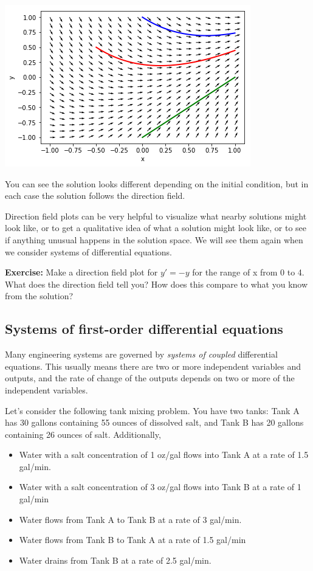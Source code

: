 \documentclass[11pt]{article}
\begin{document}
\begin{center}
\includegraphics[width=.9\linewidth]{obipy-resources/05b8b46ebbc2df3b9d545d77190f5234-683116FB.png}
\end{center}

You can see the solution looks different depending on the initial condition, but in each case the solution follows the direction field.

Direction field plots can be very helpful to visualize what nearby solutions might look like, or to get a qualitative idea of what a solution might look like, or to see if anything unusual happens in the solution space. We will see them again when we consider systems of differential equations.

\textbf{Exercise:} Make a direction field plot for \(y'=-y\) for the range of x from 0 to 4. What does the direction field tell you? How does this compare to what you know from the solution?

\subsection{Systems of first-order differential equations}
\label{sec:org969f4e7}

Many engineering systems are governed by \emph{systems of coupled} differential equations. This usually means there are two or more independent variables and outputs, and the rate of change of the outputs depends on two or more of the independent variables.

Let's consider the following tank mixing problem. You have two tanks: Tank A has 30 gallons containing 55 ounces of dissolved salt, and Tank B has 20 gallons containing 26 ounces of salt. Additionally,

\begin{itemize}
\item Water with a salt concentration of 1 oz/gal flows into Tank A at a rate of 1.5 gal/min.
\item Water with a salt concentration of 3 oz/gal flows into Tank B at a rate of 1 gal/min
\item Water flows from Tank A to Tank B at a rate of 3 gal/min.
\item Water flows from Tank B to Tank A at a rate of 1.5 gal/min
\item Water drains from Tank B at a rate of 2.5 gal/min.
\end{itemize}
\end{document}
